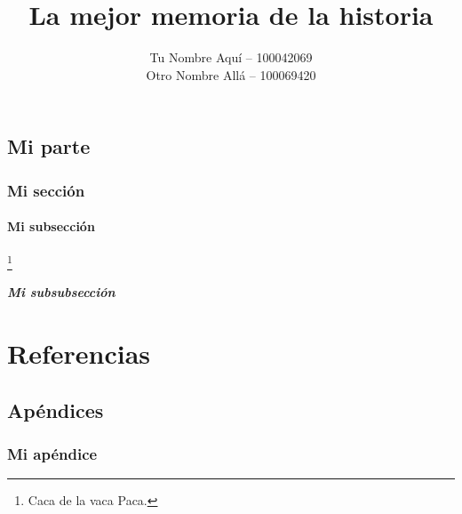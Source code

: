 \documentclass[es]{uc3mreport}
\author{
    Tu Nombre Aquí -- 100042069\\
    Otro Nombre Allá -- 100069420
}
\title{La mejor memoria de la historia}
\begin{document}
    \makecover

    \tableofcontents

    \begin{report}
        \part{Mi parte}
        \lipsum[1] \parencite{cicero45finibus}

        \section{Mi sección}
        \lipsum[1]

        \subsection{Mi subsección}
        \lipsum[2-4]\footnote{Caca de la vaca Paca.}


        \subsubsection{Mi subsubsección}
        \lipsum[2-4]
    \end{report}


    \label{bibliography}
    \part{Referencias}
    \printbibliography

    \begin{appendices}
        \part{Apéndices}  %
        \section{Mi apéndice}
        \lipsum[1]
    \end{appendices}
\end{document}
